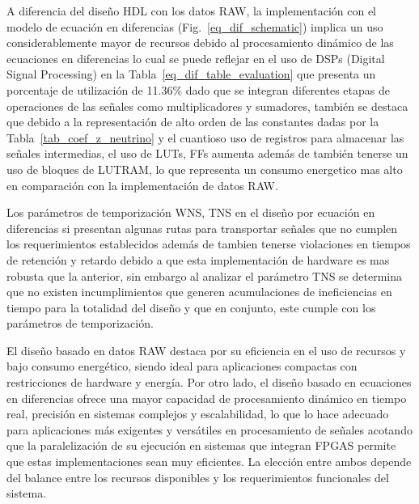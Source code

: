 \documentclass[conference]{IEEEtran}
\begin{document}
{A diferencia del diseño HDL con los datos RAW, la implementación con el modelo de ecuación en diferencias (Fig.~\ref{eq_dif_schematic}) implica un uso considerablemente mayor de recursos debido al procesamiento dinámico de las ecuaciones en diferencias lo cual se puede reflejar en el uso de DSPs (Digital Signal Processing) en la Tabla~\ref{eq_dif_table_evaluation} que presenta un porcentaje de utilización de 11.36\% dado que se integran diferentes etapas de operaciones de las señales como multiplicadores y sumadores, también se destaca que debido a la representación de alto orden de las constantes dadas por la Tabla~\ref{tab_coef_z_neutrino} y el cuantioso uso de registros para almacenar las señales intermedias, el uso de LUTs, FFs aumenta además de también tenerse un uso de bloques de LUTRAM, lo que representa un consumo energetico mas alto en comparación con la implementación de datos RAW.

Los parámetros de temporización WNS, TNS en el diseño por ecuación en diferencias si presentan algunas rutas para transportar señales que no cumplen los requerimientos establecidos además de tambien tenerse violaciones en tiempos de retención y retardo debido a que esta implementación de hardware es mas robusta que la anterior, sin embargo al analizar el parámetro TNS se determina que no existen incumplimientos que generen acumulaciones de ineficiencias en tiempo para la totalidad del diseño y que en conjunto, este cumple con los parámetros de temporización.

El diseño basado en datos RAW destaca por su eficiencia en el uso de recursos y bajo consumo energético, siendo ideal para aplicaciones compactas con restricciones de hardware y energía. Por otro lado, el diseño basado en ecuaciones en diferencias ofrece una mayor capacidad de procesamiento dinámico en tiempo real, precisión en sistemas complejos y escalabilidad, lo que lo hace adecuado para aplicaciones más exigentes y versátiles en procesamiento de señales acotando que la paralelización de su ejecución en sistemas que integran FPGAS permite que estas implementaciones sean muy eficientes. La elección entre ambos depende del balance entre los recursos disponibles y los requerimientos funcionales del sistema.



}
\end{document}
